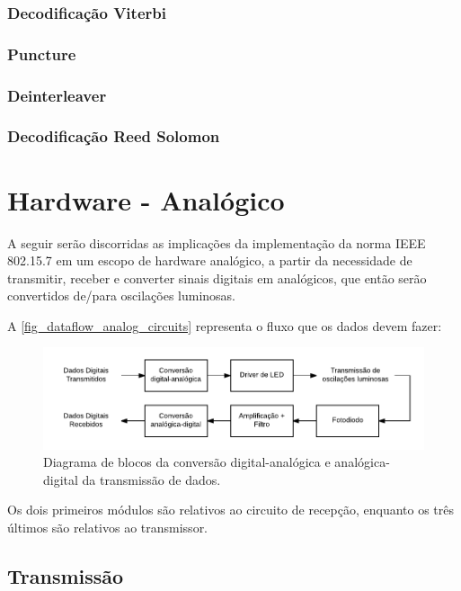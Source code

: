 	\subsubsection{Decodificação Viterbi}
	\subsubsection{Puncture}
	\subsubsection{Deinterleaver}
	\subsubsection{Decodificação Reed Solomon}
	
	\section{Hardware - Analógico}\label{sec-hardware-analog}
	
	A seguir serão discorridas as implicações da implementação da norma IEEE 802.15.7 em um escopo de hardware analógico, a partir da necessidade de transmitir, receber e converter sinais digitais em analógicos, que então serão convertidos de/para oscilações luminosas.
	
	A \autoref{fig_dataflow_analog_circuits}  representa o fluxo que os dados devem fazer:
	
	\begin{figure}[htb]
		\caption{\label{fig_dataflow_analog_circuits} Diagrama de blocos da conversão digital-analógica e analógica-digital da transmissão de dados.}
		\centering
		\includegraphics[width=0.6\textheight]{circuits/dataflow_analog_circuits.pdf}
	\end{figure}
	
	Os dois primeiros módulos são relativos ao circuito de recepção, enquanto os três últimos são relativos ao transmissor.
	
	\subsection{Transmissão}
	
